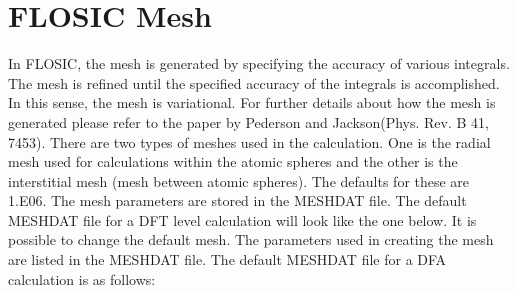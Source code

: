 \documentclass[letterpaper,10pt,english,openany,oneside]{sphinxmanual}
\begin{document}
\section{FLOSIC Mesh}
\label{\detokenize{docs/Reference/mesh:flosic-mesh}}\label{\detokenize{docs/Reference/mesh:mesh}}\label{\detokenize{docs/Reference/mesh::doc}}
\sphinxAtStartPar
In FLOSIC, the mesh is generated by specifying the accuracy of various integrals. The mesh is refined until the specified accuracy of
the integrals is accomplished. In this sense, the mesh is variational. For further details about how the mesh is generated please refer to the paper by Pederson and Jackson(Phys. Rev. B 41, 7453).
There are two types of meshes used in the calculation. One is the radial mesh used for calculations within the
atomic spheres and the other is the interstitial mesh (mesh between atomic spheres). The defaults for these are 1.E\sphinxhyphen{}06.
The mesh parameters are stored in the MESHDAT file. The default MESHDAT file for a DFT level calculation will look like the one below.
It is possible to change the default mesh.
The parameters used in creating the mesh are listed in the MESHDAT file. The default MESHDAT file for a DFA calculation is as follows:
\end{document}
